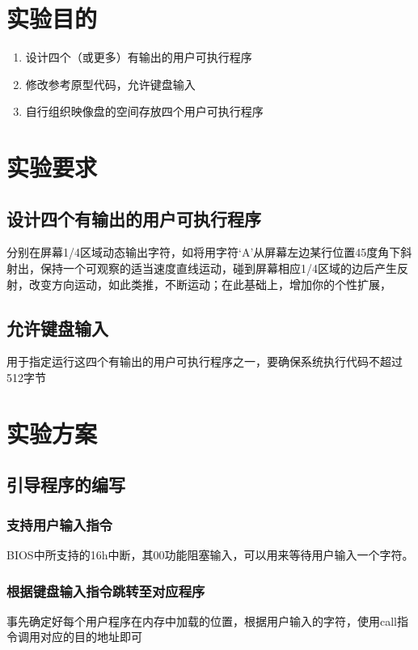 \documentclass[a4paper,11pt,UTF8]{ctexart}
\begin{document}
\section{实验目的}
	
	\begin{enumerate}
		\item 设计四个（或更多）有输出的用户可执行程序
		\item 修改参考原型代码，允许键盘输入
		\item 自行组织映像盘的空间存放四个用户可执行程序
	\end{enumerate}


\section{实验要求}

\subsection{设计四个有输出的用户可执行程序}

	分别在屏幕1/4区域动态输出字符，如将用字符‘A’从屏幕左边某行位置45度角下斜射出，保持一个可观察的适当速度直线运动，碰到屏幕相应1/4区域的边后产生反射，改变方向运动，如此类推，不断运动；在此基础上，增加你的个性扩展，

\subsection{允许键盘输入}
	用于指定运行这四个有输出的用户可执行程序之一，要确保系统执行代码不超过512字节
    

\section{实验方案}


	\subsection{引导程序的编写}

		\subsubsection{支持用户输入指令}

		BIOS中所支持的16h中断，其00功能阻塞输入，可以用来等待用户输入一个字符。
	

		\subsubsection{根据键盘输入指令跳转至对应程序}
		事先确定好每个用户程序在内存中加载的位置，根据用户输入的字符，使用call指令调用对应的目的地址即可
\end{document}
